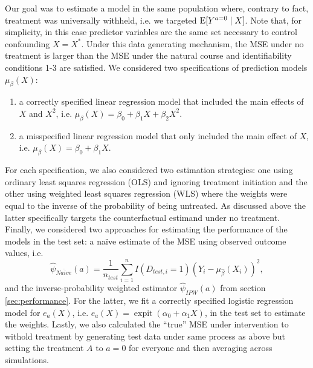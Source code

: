 Our goal was to estimate a model in the same population where, contrary to fact, treatment was universally withheld, i.e. we targeted $\operatorname{E}[Y^{a=0} \mid X]$. Note that, for simplicity, in this case predictor variables are the same set necessary to control confounding $X = X^*$. Under this data generating mechanism, the MSE under no treatment is larger than the MSE under the natural course and identifiability conditions 1-3 are satisfied. We considered two specifications of prediction models $\mu_{\beta}(X)$:
\begin{enumerate}
    \item a correctly specified linear regression model that included the main effects of $X$ and $X^2$, i.e. $\mu_{\beta}(X) = \beta_0 + \beta_1 X + \beta_2 X^2$.
    \item a misspecified linear regression model that only included the main effect of $X$, i.e. $\mu_{\beta}(X) = \beta_0 + \beta_1 X$.
\end{enumerate} 
For each specification, we also considered two estimation strategies: one using ordinary least squares regression (OLS) and ignoring treatment initiation and the other using weighted least squares regression (WLS) where the weights were equal to the inverse of the probability of being untreated. As discussed above the latter specifically targets the counterfactual estimand under no treatment. Finally, we considered two approaches for estimating the performance of the models in the test set: a na\"{i}ve estimate of the MSE using observed outcome values, i.e. 
$$\widehat{\psi}_{Na\ddot{i}ve}(a) = \frac{1}{n_{test}} \sum_{i=1}^n I(D_{test,i} = 1) (Y_i - \mu_{\widehat{\beta}}(X_i))^2,$$ 
and the inverse-probability weighted estimator $\widehat{\psi}_{IPW}(a)$ from section \ref{sec:performance}. For the latter, we fit a correctly specified logistic regression model for $e_a(X)$, i.e. $e_a(X) = \operatorname{expit}(\alpha_0 + \alpha_1 X)$, in the test set to estimate the weights. Lastly, we also calculated the ``true'' MSE under intervention to withold treatment by generating test data under same process as above but setting the treatment $A$ to $a = 0$ for everyone and then averaging across simulations.


